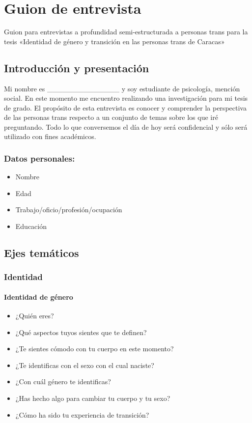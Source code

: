 \chapter{Guion de entrevista}\label{guion}

Guion para entrevistas a profundidad semi-estructurada a personas trans
para la tesis «Identidad de género y transición en las personas trans de
Caracas»

\section{Introducción y presentación}

Mi nombre es \_\_\_\_\_\_\_\_\_\_\_\_\_\_ y soy estudiante de psicología,
mención social. En este momento me encuentro realizando una investigación
para mi tesis de grado.
El propósito de esta entrevista es conocer y comprender la perspectiva de
las personas trans respecto a un conjunto de temas sobre los que
iré preguntando.
Todo lo que conversemos el día de hoy será confidencial y sólo será utilizado
con fines académicos.

\subsection{Datos personales:}

\begin{itemize}
\item
  Nombre
\item
  Edad
\item
  Trabajo/oficio/profesión/ocupación
\item
  Educación
\end{itemize}

\section{Ejes temáticos}

	\subsection{Identidad}

		\subsubsection{Identidad de género}

\begin{itemize}
\item
  ¿Quién eres?
\item
  ¿Qué aspectos tuyos sientes que te definen?
\item
  ¿Te sientes cómodo con tu cuerpo en este momento?
\item
  ¿Te identificas con el sexo con el cual naciste?
\item
  ¿Con cuál género te identificas?
\item
  ¿Has hecho algo para cambiar tu cuerpo y tu sexo?
\item
  ¿Cómo ha sido tu experiencia de transición?
\end{itemize}

